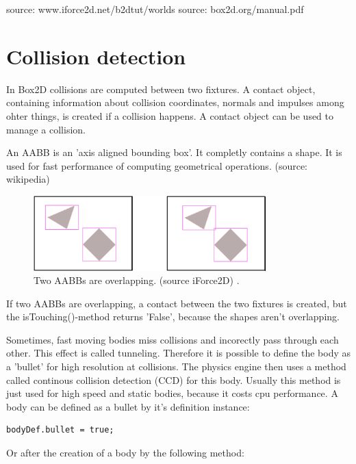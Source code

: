 \documentclass[10pt,a4paper,DIV=11]{scrreprt}
\begin{document}
source: www.iforce2d.net/b2dtut/worlds
source: box2d.org/manual.pdf

\section{Collision detection}
In Box2D collisions are computed between two fixtures. A contact object, containing information about collision coordinates, normals and impulses among ohter things, is created if a collision happens. A contact object can be used to manage a collision.

An AABB is an 'axis aligned bounding box'. It completly contains a shape. It is used for fast performance of computing geometrical operations. (source: wikipedia)

\begin{center}
	\begin{figure}[H]
		\centering
		\includegraphics[width=0.8\textwidth,scale=1.0]{files/aabbs-crossing.png}  
		\caption{Two AABBs are overlapping. (source iForce2D) \cite{box2d-iforce}.}
		\label{fig:aabbs}
	\end{figure}
\end{center}
If two AABBs are overlapping, a contact between the two fixtures is created, but the isTouching()-method returns 'False', because the shapes aren't overlapping.

Sometimes, fast moving bodies miss collisions and incorectly pass through each other. This effect is called tunneling. Therefore it is possible to define the body as a 'bullet' for high resolution at collisions. The physics engine then uses a method called continous collision detection (CCD) for this body. Usually this method is just used for high speed and static bodies, because it costs cpu performance. 
A body can be defined as a bullet by it's definition instance:

\begin{lstlisting}[caption={Define fixture as bullet before creation},label=lst:fixture-bullet-before]
bodyDef.bullet = true;
\end{lstlisting}

Or after the creation of a body by the following method:
\end{document}
